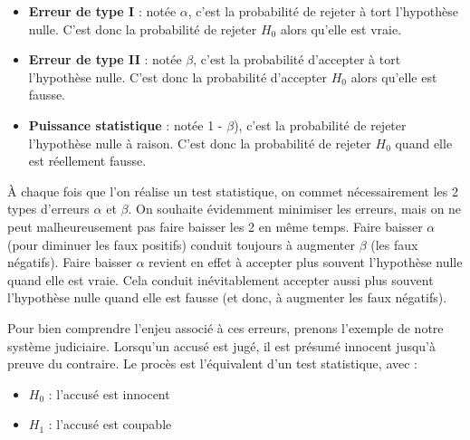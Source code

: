 \documentclass[
  a4paper,
  DIV=11,
  numbers=noendperiod,
  oneside]{scrreprt}
\providecommand{\tightlist}{%
  \setlength{\itemsep}{0pt}\setlength{\parskip}{0pt}}\usepackage{longtable,booktabs,array}
\begin{document}
\begin{tcolorbox}[enhanced jigsaw, breakable, toprule=.15mm, colbacktitle=quarto-callout-tip-color!10!white, colframe=quarto-callout-tip-color-frame, arc=.35mm, bottomtitle=1mm, opacityback=0, title=\textcolor{quarto-callout-tip-color}{\faLightbulb}\hspace{0.5em}{Définitions}, bottomrule=.15mm, colback=white, toptitle=1mm, rightrule=.15mm, leftrule=.75mm, opacitybacktitle=0.6, left=2mm, titlerule=0mm, coltitle=black]

\begin{itemize}
\item
  \textbf{Erreur de type I} : notée \(\alpha\), c'est la probabilité de
  rejeter à tort l'hypothèse nulle. C'est donc la probabilité de rejeter
  \(H_0\) alors qu'elle est vraie.
\item
  \textbf{Erreur de type II} : notée \(\beta\), c'est la probabilité
  d'accepter à tort l'hypothèse nulle. C'est donc la probabilité
  d'accepter \(H_0\) alors qu'elle est fausse.
\item
  \textbf{Puissance statistique} : notée 1 - \(\beta\)), c'est la
  probabilité de rejeter l'hypothèse nulle à raison. C'est donc la
  probabilité de rejeter \(H_0\) quand elle est réellement fausse.
\end{itemize}

\end{tcolorbox}

À chaque fois que l'on réalise un test statistique, on commet
nécessairement les 2 types d'erreurs \(\alpha\) et \(\beta\). On
souhaite évidemment minimiser les erreurs, mais on ne peut
malheureusement pas faire baisser les 2 en même temps. Faire baisser
\(\alpha\) (pour diminuer les faux positifs) conduit toujours à
augmenter \(\beta\) (les faux négatifs). Faire baisser \(\alpha\)
revient en effet à accepter plus souvent l'hypothèse nulle quand elle
est vraie. Cela conduit inévitablement accepter aussi plus souvent
l'hypothèse nulle quand elle est fausse (et donc, à augmenter les faux
négatifs).

Pour bien comprendre l'enjeu associé à ces erreurs, prenons l'exemple de
notre système judiciaire. Lorsqu'un accusé est jugé, il est présumé
innocent jusqu'à preuve du contraire. Le procès est l'équivalent d'un
test statistique, avec :

\begin{itemize}
\tightlist
\item
  \(H_0\) : l'accusé est innocent
\item
  \(H_1\) : l'accusé est coupable
\end{itemize}
\end{document}
